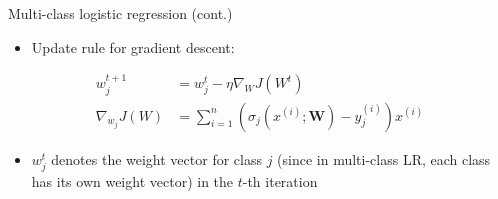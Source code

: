 \documentclass[serif, aspectratio=169]{beamer}
\begin{document}
\begin{frame}{Multi-class logistic regression (cont.)}
    \begin{itemize}
        \item Update rule for gradient descent:
        
    \end{itemize}
    \begin{align*}
            w_j^{t+1} &= w_j^t - \eta \nabla _W J(W^t) \\
            \nabla _{w_{j}} J(W) &= \sum_{i=1}^{n} (\sigma _j(x^{(i)}; \mathbf{W}) - y_j^{(i)})x^{(i)}
        \end{align*}
        
    \begin{itemize}
        \item $w_j^t$ denotes the weight vector for class $j$ (since in multi-class LR, each class has its own weight vector) in the $t$-th iteration
    \end{itemize}
\end{frame}



\end{document}

